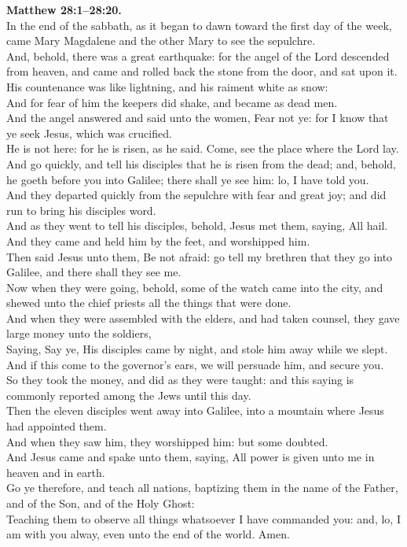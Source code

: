 \documentclass[10pt]{article} %
\begin{document}
{\begin{minipage}[t]{0.45\textwidth}
\textbf{Matthew 28:1--28:20.}\\
In the end of the sabbath, as it began to dawn toward the first day of the week, came Mary Magdalene and the other Mary to see the sepulchre.\\
And, behold, there was a great earthquake: for the angel of the Lord descended from heaven, and came and rolled back the stone from the door, and sat upon it.\\
His countenance was like lightning, and his raiment white as snow:\\
And for fear of him the keepers did shake, and became as dead men.\\
And the angel answered and said unto the women, Fear not ye: for I know that ye seek Jesus, which was crucified.\\
He is not here: for he is risen, as he said. Come, see the place where the Lord lay.\\
And go quickly, and tell his disciples that he is risen from the dead; and, behold, he goeth before you into Galilee; there shall ye see him: lo, I have told you.\\
And they departed quickly from the sepulchre with fear and great joy; and did run to bring his disciples word.\\
And as they went to tell his disciples, behold, Jesus met them, saying, All hail. And they came and held him by the feet, and worshipped him.\\
Then said Jesus unto them, Be not afraid: go tell my brethren that they go into Galilee, and there shall they see me.\\
Now when they were going, behold, some of the watch came into the city, and shewed unto the chief priests all the things that were done.\\
And when they were assembled with the elders, and had taken counsel, they gave large money unto the soldiers,\\
Saying, Say ye, His disciples came by night, and stole him away while we slept.\\
And if this come to the governor's ears, we will persuade him, and secure you.\\
So they took the money, and did as they were taught: and this saying is commonly reported among the Jews until this day.\\
Then the eleven disciples went away into Galilee, into a mountain where Jesus had appointed them.\\
And when they saw him, they worshipped him: but some doubted.\\
And Jesus came and spake unto them, saying, All power is given unto me in heaven and in earth.\\
Go ye therefore, and teach all nations, baptizing them in the name of the Father, and of the Son, and of the Holy Ghost:\\
Teaching them to observe all things whatsoever I have commanded you: and, lo, I am with you alway, even unto the end of the world. Amen.\\

\end{minipage}}
\end{document}
